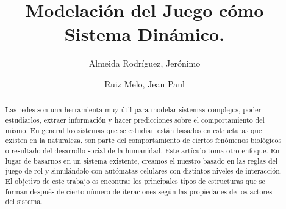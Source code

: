 

\title{Modelación del Juego \dnd cómo Sistema Dinámico.}

\author[1,2\space *]{Almeida Rodríguez, Jerónimo}
\author[1,2\space *]{Ruiz Melo, Jean Paul}


\maketitle

\begin{abstract}
Las redes son una herramienta muy útil para modelar sistemas complejos, poder
estudiarlos, extraer información y hacer predicciones sobre el comportamiento
del mismo. En general los sistemas que se estudian están basados en estructuras
que existen en la naturaleza, son parte del comportamiento de ciertos fenómenos
biológicos o resultado del desarrollo social de la humanidad. Este artículo toma
otro enfoque. En lugar de basarnos en un sistema existente, creamos el nuestro
basado en las reglas del juego de rol \dnd y simulándolo con autómatas celulares
con distintos niveles de interacción. El objetivo de este trabajo es encontrar
los principales tipos de estructuras que se forman después de cierto número de
iteraciones según las propiedades de los actores del sistema.

\end {abstract}


